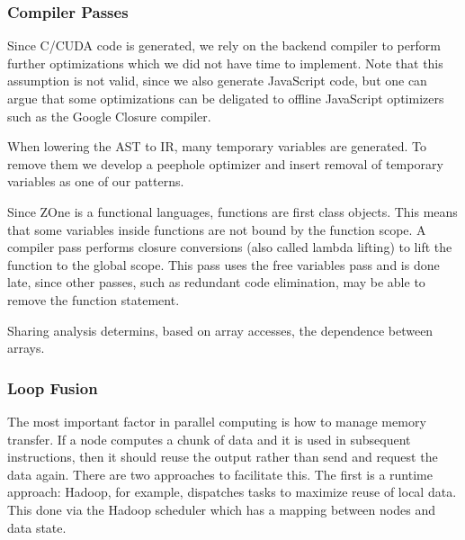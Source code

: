 \subsubsection{Compiler Passes}

Since C/CUDA code is generated, we rely on the backend compiler
	to perform further optimizations which we did not have time
	to implement.
Note that this assumption is not valid, since we also generate
	JavaScript code, but one can argue that some optimizations
	can be deligated to offline JavaScript optimizers such as the 
	Google Closure\cite{bolin2010closure} compiler. 


When lowering the AST to IR, many temporary variables are generated.
To remove them we develop a peephole optimizer and insert removal of
	temporary variables as one of our patterns.






Since ZOne is a functional languages, functions are 
	first class objects.
This means that some variables inside functions are not
	bound by the function scope.
A compiler pass performs closure conversions (also called
	lambda lifting) to lift the function to the global scope.
This pass uses the free variables pass and is done late,
	since other passes, such as 
	redundant code elimination, may be able to remove the
	function statement.


Sharing analysis determins, based on array accesses, the 
	dependence between arrays.


\subsubsection{Loop Fusion}\label{loop-fusion}

The most important factor in parallel computing is how to manage memory
transfer. If a node computes a chunk of data and it is used in
subsequent instructions, then it should reuse the output rather than
send and request the data again. There are two approaches to facilitate
this. The first is a runtime approach: Hadoop, for example, dispatches
tasks to maximize reuse of local data. This done via the Hadoop
scheduler which has a mapping between nodes and data state.

